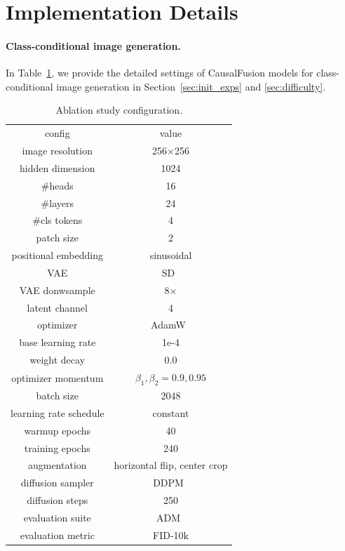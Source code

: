 \section{Implementation Details}\label{appendix:secC}
\label{appendix:impl}

\paragraph{Class-conditional image generation.} In Table~\ref{tab:impl_abla}, we provide the detailed settings of CausalFusion models for class-conditional image generation in Section~\ref{sec:init_exps} and \ref{sec:difficulty}.
\vspace{-5pt}

\begin{table}[h]
    \footnotesize
    \begin{tabular}{c|c}
        config & value \\
        \shline
        image resolution & 256$\times$256 \\
        hidden dimension & 1024 \\
        \#heads & 16 \\
        \#layers & 24 \\
        \#cls tokens & 4 \\
        patch size & 2 \\
        positional embedding & sinusoidal \\
        VAE & SD~\cite{SD-vae} \\
        VAE donwsample& 8$\times$ \\
        latent channel & 4 \\
        \hline
        optimizer & AdamW~\cite{loshchilov2017decoupled} \\
        base learning rate & 1e-4 \\
        weight decay & 0.0 \\
        optimizer momentum & $\beta_1, \beta_2{=}0.9, 0.95$ \\
        batch size & 2048 \\
        learning rate schedule & constant \\
        warmup epochs & 40 \\
        training epochs & 240 \\
        augmentation & horizontal flip, center crop \\
        \hline
        diffusion sampler & DDPM~\cite{ddpm} \\
        diffusion steps & 250 \\
        evaluation suite & ADM~\cite{adm} \\
        evaluation metric & FID-10k
    \end{tabular}
    \caption{{Ablation study} configuration.}
    \label{tab:impl_abla} 
\end{table}

